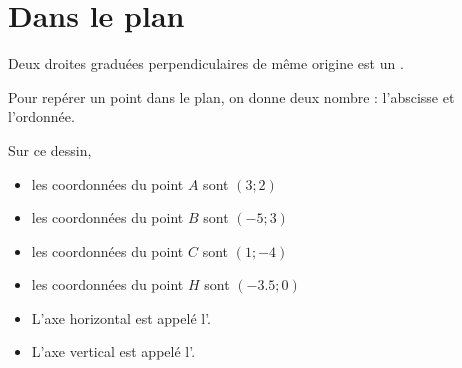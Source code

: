 \section{Dans le plan}



\begin{definition}
    Deux droites graduées perpendiculaires de même origine est un . 
\end{definition}

\begin{Aretenir}
    Pour repérer un point dans le plan, on donne deux nombre : l'abscisse et l'ordonnée.
\end{Aretenir}

\begin{example}
    \begin{center}
        
    \end{center}
    Sur ce dessin,
    \begin{itemize}
        \item les coordonnées du point \( A\) sont \(  (3;2)  \)
        \item les coordonnées du point \( B\) sont \(  (-5;3)  \)
        \item les coordonnées du point \( C\) sont \(  (1;-4)  \)
        \item les coordonnées du point \( H\) sont \(  (-3.5;0)  \)
    \end{itemize}
\end{example}

\begin{definition}
    \begin{itemize}
        \item 
            L'axe horizontal est appelé l'.
        \item
            L'axe vertical est appelé l'.
    \end{itemize}
\end{definition}


